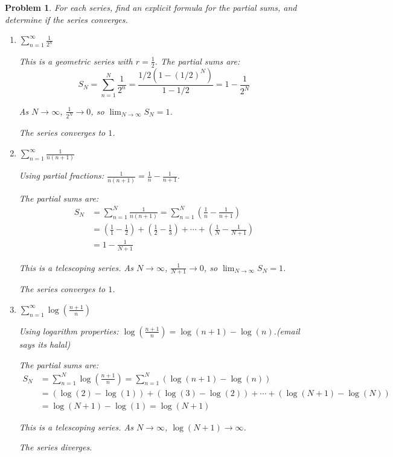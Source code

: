 \documentclass[12pt]{article}
\newtheorem{problem}{Problem}
\begin{document}
\begin{problem} %
For each series, find an explicit formula for the partial sums, and determine if the series converges.

\renewcommand{\labelenumi}{(\alph{enumi})}
\begin{enumerate}
\item $\displaystyle \sum_{n=1}^\infty \frac{1}{2^n}$

This is a geometric series with $r = \frac{1}{2}$. The partial sums are:
$$S_N = \sum_{n=1}^N \frac{1}{2^n} = \frac{1/2(1 - (1/2)^N)}{1 - 1/2} = 1 - \frac{1}{2^N}$$

As $N \to \infty$, $\frac{1}{2^N} \to 0$, so $\lim_{N\to\infty} S_N = 1$. 

The series converges to $1$.


\item $\displaystyle \sum_{n=1}^\infty \frac{1}{n(n+1)}$

Using partial fractions: $\frac{1}{n(n+1)} = \frac{1}{n} - \frac{1}{n+1}$.

The partial sums are:
\begin{align*}
S_N &= \sum_{n=1}^N \frac{1}{n(n+1)} = \sum_{n=1}^N \left(\frac{1}{n} - \frac{1}{n+1}\right) \\
&= \left(\frac{1}{1} - \frac{1}{2}\right) + \left(\frac{1}{2} - \frac{1}{3}\right) + \cdots + \left(\frac{1}{N} - \frac{1}{N+1}\right) \\
&= 1 - \frac{1}{N+1}
\end{align*}

This is a telescoping series. As $N \to \infty$, $\frac{1}{N+1} \to 0$, so $\lim_{N\to\infty} S_N = 1$.

The series converges to $1$.

\item $\displaystyle \sum_{n=1}^\infty \log\left(\frac{n+1}{n}\right)$  %

Using logarithm properties: $\log\left(\frac{n+1}{n}\right) = \log(n+1) - \log(n)$.(email says its halal)

The partial sums are:
\begin{align*}
S_N &= \sum_{n=1}^N \log\left(\frac{n+1}{n}\right) = \sum_{n=1}^N (\log(n+1) - \log(n)) \\
&= (\log(2) - \log(1)) + (\log(3) - \log(2)) + \cdots + (\log(N+1) - \log(N)) \\
&= \log(N+1) - \log(1) = \log(N+1)
\end{align*}

This is a telescoping series. As $N \to \infty$, $\log(N+1) \to \infty$.

The series diverges.

\end{enumerate}
\end{problem}
\end{document}
